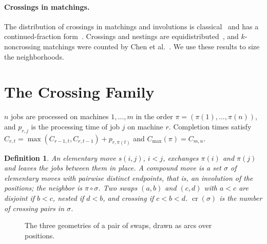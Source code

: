 \documentclass[10pt,twocolumn]{article}
\newtheorem{definition}{Definition}
\newcommand{\ncr}{\operatorname{cr}}
\begin{document}
\paragraph{Crossings in matchings.} The distribution of crossings in
matchings and involutions is classical~\cite{touchard1952,riordan1975}
and has a continued-fraction form~\cite{flajolet1980}. Crossings and
nestings are equidistributed~\cite{kasraoui2006}, and $k$-noncrossing
matchings were counted by Chen et al.~\cite{chen2007}. We use these
results to size the neighborhoods.

\section{The Crossing Family}\label{sec:family}

$n$ jobs are processed on machines $1,\dots,m$ in the order
$\pi=(\pi(1),\dots,\pi(n))$, and $p_{r,j}$ is the processing time of job
$j$ on machine $r$. Completion times satisfy
$C_{r,t}=\max(C_{r-1,t},C_{r,t-1})+p_{r,\pi(t)}$ and
$C_{\max}(\pi)=C_{m,n}$.

\begin{definition}
An \emph{elementary move} $s(i,j)$, $i<j$, exchanges $\pi(i)$ and
$\pi(j)$ and leaves the jobs between them in place. A \emph{compound
move} is a set $\sigma$ of elementary moves with pairwise distinct
endpoints, that is, an involution of the positions; the neighbor is
$\pi\circ\sigma$. Two swaps $(a,b)$ and $(c,d)$ with $a<c$ are
\emph{disjoint} if $b<c$, \emph{nested} if $d<b$, and \emph{crossing} if
$c<b<d$. $\ncr(\sigma)$ is the number of crossing pairs in $\sigma$.
\end{definition}

\begin{figure}[t]
\centering
{}
\caption{The three geometries of a pair of swaps, drawn as arcs over
positions.}
\label{fig:geometry}
\end{figure}
\end{document}
